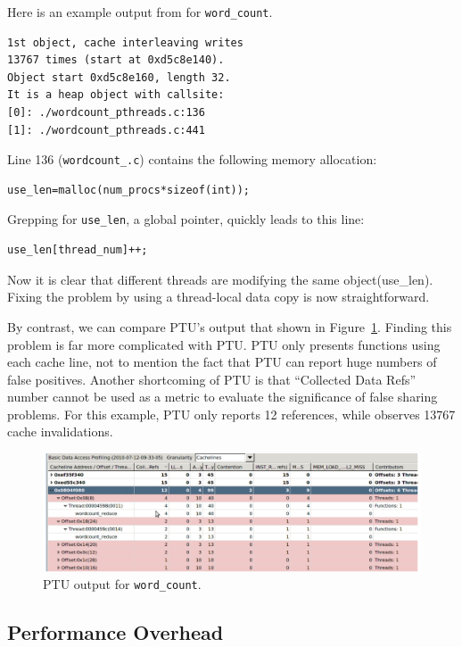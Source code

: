 Here is an example output from \sheriffdetect{} for \texttt{word\_count}.

\begin{verbatim} 
1st object, cache interleaving writes 
13767 times (start at 0xd5c8e140). 
Object start 0xd5c8e160, length 32. 
It is a heap object with callsite:
[0]: ./wordcount_pthreads.c:136
[1]: ./wordcount_pthreads.c:441
\end{verbatim}

Line 136 (\texttt{wordcount\_\pthreads{}.c}) contains the following memory allocation:

\begin{verbatim}
use_len=malloc(num_procs*sizeof(int));
\end{verbatim}

Grepping for \texttt{use\_len}, a global pointer, quickly leads to this line:

\begin{verbatim}
use_len[thread_num]++;
\end{verbatim}

Now it is clear that different threads are modifying the same object(use\_len). Fixing the problem by using a thread-local data copy is now straightforward.

By contrast, we can compare PTU's output that shown in Figure~\ref{fig:wordcount}. Finding this problem is far more complicated with PTU. PTU only presents functions using each cache line, not to mention the fact that PTU can report huge numbers of false positives.  Another shortcoming of PTU is that ``Collected Data Refs'' number cannot be used as a metric to evaluate the significance of false sharing problems. For this example, PTU only reports 12 references, while \sheriffdetect{} observes 13767 cache invalidations.

\begin{figure}[!t]
\centering
\includegraphics[width=6in]{sheriff/figure/wordcount}
\caption{PTU output for \texttt{word\_count}.
\label{fig:wordcount}}
\end{figure}

\subsection{\sheriffdetect{} Performance Overhead}
\label{sec:results-runtime-overhead}

